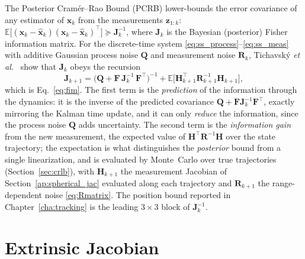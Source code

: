 The Posterior Cram\'er--Rao Bound (PCRB) lower-bounds the error covariance of any
estimator of $\bm{x}_k$ from the measurements $\bm{z}_{1:k}$:
$\mathbb{E}\!\big[(\bm{x}_k-\hat{\bm{x}}_k)(\bm{x}_k-\hat{\bm{x}}_k)^{\top}\big]\succeq\bm{J}_k^{-1}$,
where $\bm{J}_k$ is the Bayesian (posterior) Fisher information matrix. For the
discrete-time system \eqref{eq:ss_process}--\eqref{eq:ss_meas} with additive
Gaussian process noise $\bm{Q}$ and measurement noise $\bm{R}_k$, Tichavsk\'y
\textit{et al.}\ \cite{tichavsky1998} show that $\bm{J}_k$ obeys the recursion
\begin{equation}
  \bm{J}_{k+1} = \big(\bm{Q}+\bm{F}\,\bm{J}_k^{-1}\,\bm{F}^{\top}\big)^{-1}
              + \mathbb{E}\!\big[\bm{H}_{k+1}^{\top}\bm{R}_{k+1}^{-1}\bm{H}_{k+1}\big],
  \label{ap:fim_rec}
\end{equation}
which is Eq.~\eqref{eq:fim}. The first term is the \emph{prediction} of the
information through the dynamics: it is the inverse of the predicted covariance
$\bm{Q}+\bm{F}\bm{J}_k^{-1}\bm{F}^{\top}$, exactly mirroring the Kalman time
update, and it can only \emph{reduce} the information, since the process noise
$\bm{Q}$ adds uncertainty. The second term is the \emph{information gain} from the
new measurement, the expected value of $\bm{H}^{\top}\bm{R}^{-1}\bm{H}$ over the
state trajectory; the expectation is what distinguishes the \emph{posterior} bound
from a single linearization, and is evaluated by Monte~Carlo over true
trajectories (Section~\ref{sec:crlb}), with $\bm{H}_{k+1}$ the measurement Jacobian
of Section~\ref{ap:spherical_jac} evaluated along each trajectory and $\bm{R}_{k+1}$
the range-dependent noise \eqref{eq:Rmatrix}. The position bound reported in
Chapter~\ref{cha:tracking} is the leading $3\times3$ block of $\bm{J}_k^{-1}$.

\section{Extrinsic Jacobian}
\label{ap:extrinsic_jac}

